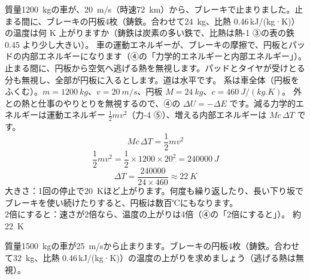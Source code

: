 \label{ph:熱-2:ex6}
\begin{phreidai}
質量\qty{1200}{kg}の車が、\qty{20}{m/s}（時速\qty{72}{km}）から、ブレーキで止まりました。止まる間に、ブレーキの円板4枚（鋳鉄。合わせて\qty{24}{kg}、比熱 0.46\,kJ/(kg·K)）の温度は何 K 上がりますか（鋳鉄は炭素の多い鉄で、比熱は熱-1 ③の表の鉄 0.45 より少し大きい）。
\phbamen
車の運動エネルギーが、ブレーキの摩擦で、円板とパッドの内部エネルギーになります（④の「力学的エネルギーと内部エネルギー」）。
\phmushi
止まる間に、円板から空気へ逃げる熱を無視します。パッドとタイヤが受けとる分も無視し、全部が円板に入るとします。道は水平です。
\phzu
系は車全体（円板をふくむ）。$m=\qty{1200}{kg}$、$v=\qty{20}{m/s}$、円板 $M=\qty{24}{kg}$、$c=\qty{460}{J/(kg.K)}$。
\phriyu
外との熱と仕事のやりとりを無視するので、④の $\Delta U=-\Delta E$ です。減る力学的エネルギーは運動エネルギー $\tfrac{1}{2}mv^2$（力-4 ⑤）、増える内部エネルギーは $Mc\,\Delta T$ です。
\phtateru
\[Mc\,\Delta T=\frac{1}{2}mv^2\]
\phtoku
\[\frac{1}{2}mv^2=\frac{1}{2}\times1200\times20^2=\qty{240000}{J}\]
\[\Delta T=\frac{\num{240000}}{24\times460}\approx\qty{22}{K}\]
\phtashikame
大きさ：1回の停止で\qty{20}{K}ほど上がります。何度も繰り返したり、長い下り坂でブレーキを使い続けたりすると、円板は数百℃にもなります。\\
2倍にすると：速さが2倍なら、温度の上がりは4倍（④の「2倍にすると」）。
\kotae 約\qty{22}{K}
\end{phreidai}
\begin{jibun}
質量\qty{1500}{kg}の車が\qty{25}{m/s}から止まります。ブレーキの円板4枚（鋳鉄。合わせて\qty{32}{kg}、比熱 0.46\,kJ/(kg·K)）の温度の上がりを求めましょう（逃げる熱は無視）。
\end{jibun}

